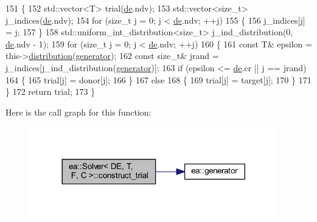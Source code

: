 \begin{DoxyCode}
151     \{
152         std::vector<T> trial(\hyperlink{classea_1_1_solver_3_01_d_e_00_01_t_00_01_f_00_01_c_01_4_a789b8665ce321248e3999907c37d0963}{de}.ndv);
153         std::vector<size\_t> j\_indices(\hyperlink{classea_1_1_solver_3_01_d_e_00_01_t_00_01_f_00_01_c_01_4_a789b8665ce321248e3999907c37d0963}{de}.ndv);
154         \textcolor{keywordflow}{for} (\textcolor{keywordtype}{size\_t} j = 0; j < \hyperlink{classea_1_1_solver_3_01_d_e_00_01_t_00_01_f_00_01_c_01_4_a789b8665ce321248e3999907c37d0963}{de}.ndv; ++j)
155         \{
156             j\_indices[j] = j;
157         \}
158         std::uniform\_int\_distribution<size\_t> j\_ind\_distribution(0, \hyperlink{classea_1_1_solver_3_01_d_e_00_01_t_00_01_f_00_01_c_01_4_a789b8665ce321248e3999907c37d0963}{de}.ndv - 1);
159         \textcolor{keywordflow}{for} (\textcolor{keywordtype}{size\_t} j = 0; j < \hyperlink{classea_1_1_solver_3_01_d_e_00_01_t_00_01_f_00_01_c_01_4_a789b8665ce321248e3999907c37d0963}{de}.ndv; ++j)
160         \{
161             \textcolor{keyword}{const} T& epsilon = this->\hyperlink{classea_1_1_solver__base_ae88f44b13e264e092d3bbaeca6b3bd19}{distribution}(\hyperlink{namespaceea_a385e8ca8ba4ae2f69dcfffa79f20c2ff}{generator});
162             \textcolor{keyword}{const} \textcolor{keywordtype}{size\_t}& jrand = j\_indices[j\_ind\_distribution(\hyperlink{namespaceea_a385e8ca8ba4ae2f69dcfffa79f20c2ff}{generator})];
163             \textcolor{keywordflow}{if} (epsilon <= \hyperlink{classea_1_1_solver_3_01_d_e_00_01_t_00_01_f_00_01_c_01_4_a789b8665ce321248e3999907c37d0963}{de}.cr || j == jrand)
164             \{
165                 trial[j] = donor[j];
166             \}
167             \textcolor{keywordflow}{else}
168             \{
169                 trial[j] = target[j];
170             \}
171         \}
172         \textcolor{keywordflow}{return} trial;
173     \}
\end{DoxyCode}
Here is the call graph for this function\+:
\nopagebreak
\begin{figure}[H]
\begin{center}
\leavevmode
\includegraphics[width=305pt]{classea_1_1_solver_3_01_d_e_00_01_t_00_01_f_00_01_c_01_4_a043f8134c53f09519283b8320d7a2ade_cgraph}
\end{center}
\end{figure}
\mbox{\label{classea_1_1_solver_3_01_d_e_00_01_t_00_01_f_00_01_c_01_4_a122c904c555a0be3b27160d6f883fd1b}} 
